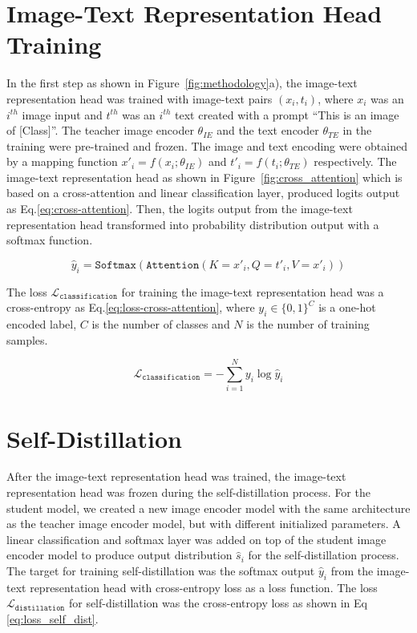 \section{Image-Text Representation Head Training}
In the first step as shown in Figure~\ref{fig:methodology}a), the image-text representation head was trained with image-text pairs $(x_i, t_i)$, where $x_i$ was an $i^{th}$ image input and $t^{th}$ was an $i^{th}$ text created with a prompt ``This is an image of [Class]''.
The teacher image encoder $\theta_{IE}$ and the text encoder $\theta_{TE}$ in the training were pre-trained and frozen.
The image and text encoding were obtained by a mapping function $x'_i = f(x_i; \theta_{IE})$ and $t'_i = f(t_i; \theta_{TE})$ respectively.
The image-text representation head as shown in Figure~\ref{fig:cross_attention} which is based on a cross-attention and linear classification layer, produced logits output as Eq.\ref{eq:cross-attention}.
Then, the logits output from the image-text representation head transformed into probability distribution output with a softmax function.

\begin{equation}
    \label{eq:cross-attention}
    \hat{y}_i = \texttt{Softmax}(\texttt{Attention}(K=x'_i, Q=t'_i, V=x'_i))
\end{equation}

The loss $\mathcal{L}_{\texttt{classification}}$ for training the image-text representation head was a cross-entropy as Eq.\ref{eq:loss-cross-attention}, where $y_i\in\{ 0,1 \}^{C}$ is a one-hot encoded label, $C$ is the number of classes and $N$ is the number of training samples.

\begin{equation}
    \label{eq:loss-cross-attention}
    \mathcal{L}_{\texttt{classification}} = -\sum_{i=1}^{N} y_i\log\hat{y}_i
\end{equation}

\section{Self-Distillation}
After the image-text representation head was trained, the image-text representation head was frozen during the self-distillation process.
For the student model, we created a new image encoder model with the same architecture as the teacher image encoder model, but with different initialized parameters.
A linear classification and softmax layer was added on top of the student image encoder model to produce output distribution $\hat{s}_i$ for the self-distillation process.
The target for training self-distillation was the softmax output $\hat{y}_i$ from the image-text representation head with cross-entropy loss as a loss function.
The loss $\mathcal{L}_{\texttt{distillation}}$ for self-distillation was the cross-entropy loss as shown in Eq \ref{eq:loss_self_dist}.

